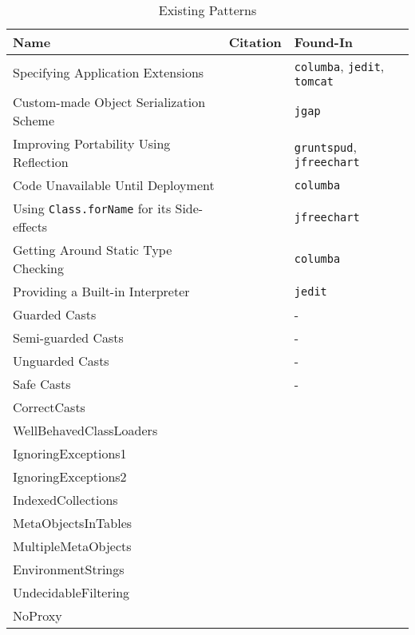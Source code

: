 \begin{table}[htbp]
\caption{Existing Patterns}
\centering
\begin{tabular}{lll}
Name & Citation & Found-In\\
\hline
Specifying Application Extensions & \cite{livshits_improving_2006} & \texttt{columba}, \texttt{jedit}, \texttt{tomcat}\\
Custom-made Object Serialization Scheme & \cite{livshits_improving_2006} & \texttt{jgap}\\
Improving Portability Using Reflection & \cite{livshits_improving_2006} & \texttt{gruntspud}, \texttt{jfreechart}\\
Code Unavailable Until Deployment & \cite{livshits_improving_2006} & \texttt{columba}\\
Using \texttt{Class.forName} for its Side-effects & \cite{livshits_improving_2006} & \texttt{jfreechart}\\
Getting Around Static Type Checking & \cite{livshits_improving_2006} & \texttt{columba}\\
Providing a Built-in Interpreter & \cite{livshits_improving_2006} & \texttt{jedit}\\
Guarded Casts & \cite{winther_guarded_2011} & -\\
Semi-guarded Casts & \cite{winther_guarded_2011} & -\\
Unguarded Casts & \cite{winther_guarded_2011} & -\\
Safe Casts & \cite{winther_guarded_2011} & -\\
CorrectCasts & \cite{landman_challenges_2017} & \\
WellBehavedClassLoaders & \cite{landman_challenges_2017} & \\
IgnoringExceptions1 & \cite{landman_challenges_2017} & \\
IgnoringExceptions2 & \cite{landman_challenges_2017} & \\
IndexedCollections & \cite{landman_challenges_2017} & \\
MetaObjectsInTables & \cite{landman_challenges_2017} & \\
MultipleMetaObjects & \cite{landman_challenges_2017} & \\
EnvironmentStrings & \cite{landman_challenges_2017} & \\
UndecidableFiltering & \cite{landman_challenges_2017} & \\
NoProxy & \cite{landman_challenges_2017} & \\
\end{tabular}
\end{table}

